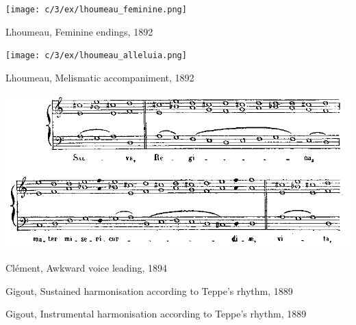 \clearpage

\vspace*{\fill}

\begin{example}
  \centering
  \texttt{[image: c/3/ex/lhoumeau\_feminine.png]}
  \caption{Lhoumeau, Feminine endings, 1892}
  \label{mus:lhoumeau_feminine}
\end{example}

\vspace*{\fill}

\begin{example}
  \centering
  \texttt{[image: c/3/ex/lhoumeau\_alleluia.png]}
  \caption{Lhoumeau, Melismatic accompaniment, 1892}
  \label{mus:lhoumeau_alleluia}
\end{example}

\vspace*{\fill}

\clearpage

\begin{landscape}
  \vspace*{\fill}
  \begin{example}
    \centering
    \includegraphics[width=.8\linewidth]{c/3/ex/clement_awkward_191.jpg}
    \caption{Clément, Awkward voice leading, 1894}
    \label{mus:clement_awkward_191}
  \end{example}
  \vspace*{\fill}
\end{landscape}

\vspace*{\fill}

\begin{example}
  \caption{Gigout, Sustained harmonisation according to Teppe's rhythm, 1889}
  \label{mus:teppe_gigoutone}
\end{example}

\vspace*{\fill}


\begin{example}
  \caption{Gigout, Instrumental harmonisation according to Teppe's rhythm, 1889}
  \label{mus:teppe_gigouttwo}
\end{example}



